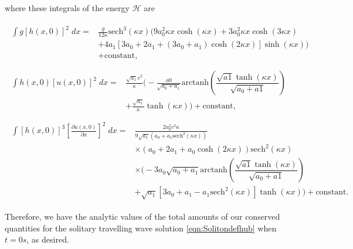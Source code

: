 where these integrals of the energy $\mathcal{H}$ are

\begin{align*}
\begin{split}
\int g\left[h(x,0)\right]^2 \; dx ={}& \frac{g}{12 \kappa }\text{sech}^3\left(\kappa x\right) \Bigg(9a_0^2 \kappa x \cosh\left(\kappa x\right) + 3 a_0^2 \kappa x \cosh\left(3\kappa x\right) \\ &+ 4 a_1 \left[3a_0 + 2 a_1 + \left(3a_0 + a_1\right)\cosh\left(2\kappa x\right)\right] \sinh\left(\kappa x\right)\Bigg) \\ &+ \text{constant},
\end{split}\\ \\
\begin{split}
\int h(x,0)\left[u(x,0)\right]^2 \; dx = {}& \frac{\sqrt{a_1}c^2}{\kappa} \Bigg( -\frac{a0}{\sqrt{a_0 + a_1}} \text{arctanh}\left(\dfrac{\sqrt{a1} \tanh\left(\kappa x\right)}{\sqrt{a_0 + a1}}\right)\\ &+ \frac{\sqrt{a_1}}{\kappa}\tanh\left(\kappa x\right)\Bigg)  + \text{constant},
\end{split} 
\\ \\
\begin{split}
\int \left[h(x,0)\right]^3 \left[\frac{\partial u(x,0)}{\partial x}\right]^2 \; dx = {}& \frac{2a_0^2c^2 \kappa }{9 \sqrt{a_1} \left(a_0 + a_1\text{sech}^2\left(\kappa x \right) \right)}   \\ &\times\left(a_0 + 2a_1 + a_0 \cosh\left(2\kappa x\right) \right) \text{sech}^2\left(\kappa x\right) \\&\times \Bigg(-3 a_0 \sqrt{a_0 + a_1}\text{arctanh}\left(\dfrac{\sqrt{a1} \tanh\left(\kappa x\right)}{\sqrt{a_0 + a1}}\right)  \\ &+ \sqrt{a_1}\left[3a_0 + a_1 - a_1\text{sech}^2\left(\kappa x\right)\right]\tanh(\kappa x) \Bigg)+ \text{constant}.
\end{split}
\end{align*}

Therefore, we have the analytic values of the total amounts of our conserved quantities for the solitary travelling wave solution \eqref{eqn:Solitondefhub} when $t=0s$, as desired.

